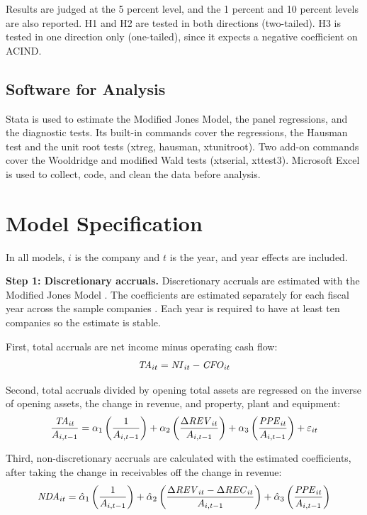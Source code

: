 Results are judged at the 5 percent level, and the 1 percent and 10 percent levels are also reported. H1 and H2 are tested in both directions (two-tailed). H3 is tested in one direction only (one-tailed), since it expects a negative coefficient on ACIND.

\subsection{Software for Analysis}

Stata is used to estimate the Modified Jones Model, the panel regressions, and the diagnostic tests. Its built-in commands cover the regressions, the Hausman test and the unit root tests (xtreg, hausman, xtunitroot). Two add-on commands cover the Wooldridge and modified Wald tests (xtserial, xttest3). Microsoft Excel is used to collect, code, and clean the data before analysis.

\section{Model Specification}
\label{sec:model-spec}

In all models, $i$ is the company and $t$ is the year, and year effects are included.

\textbf{Step 1: Discretionary accruals.} Discretionary accruals are estimated with the Modified Jones Model \parencite{dechow1995}. The coefficients are estimated separately for each fiscal year across the sample companies \parencite{defond1994}. Each year is required to have at least ten companies so the estimate is stable.

First, total accruals are net income minus operating cash flow:
\begin{equation}
  \mathit{TA}_{it} = \mathit{NI}_{it} - \mathit{CFO}_{it}
\end{equation}

Second, total accruals divided by opening total assets are regressed on the inverse of opening assets, the change in revenue, and property, plant and equipment:
\begin{equation}
  \frac{\mathit{TA}_{it}}{A_{i,t-1}}
  = \alpha_1\left(\frac{1}{A_{i,t-1}}\right)
  + \alpha_2\left(\frac{\Delta\mathit{REV}_{it}}{A_{i,t-1}}\right)
  + \alpha_3\left(\frac{\mathit{PPE}_{it}}{A_{i,t-1}}\right)
  + \varepsilon_{it}
\end{equation}

Third, non-discretionary accruals are calculated with the estimated coefficients, after taking the change in receivables off the change in revenue:
\begin{equation}
  \mathit{NDA}_{it}
  = \hat{\alpha}_1\left(\frac{1}{A_{i,t-1}}\right)
  + \hat{\alpha}_2\left(\frac{\Delta\mathit{REV}_{it} - \Delta\mathit{REC}_{it}}{A_{i,t-1}}\right)
  + \hat{\alpha}_3\left(\frac{\mathit{PPE}_{it}}{A_{i,t-1}}\right)
\end{equation}


